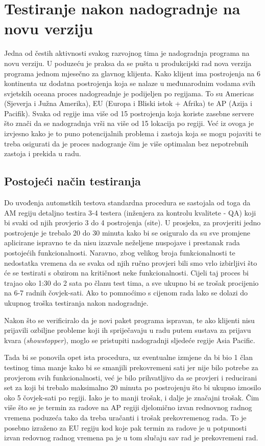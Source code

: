 \chapter{Testiranje nakon nadogradnje na novu verziju}\label{postdeploy}

Jedna od čestih aktivnosti svakog razvojnog tima je nadogradnja programa na novu verziju.
U poduzeću je praksa da se pušta u produkcijski rad nova verzija programa jednom mjesečno za glavnog klijenta. 
Kako klijent ima postrojenja na 6 kontinenta uz dodatna postrojenja koja se nalaze u međunarodnim vodama svih svjetskih oceana proces nadogreadnje je podijeljen po regijama.
To su Americas (Sjeverja i Južna Amerika), EU (Europa i Bliski istok + Afrika) te AP (Azija i Pacifik).
Svaka od regije ima više od 15 postrojenja koja koriste zasebne servere što znači da se nadogradnja vrši na više od 15 lokacija po regiji.
Već iz ovoga je izvjesno kako je to puno potencijalnih problema i zastoja koja se mogu pojaviti te treba osigurati da je proces nadogranje čim je više optimalan bez nepotrebnih zastoja i prekida u radu.

\section{Postojeći način testiranja}
Do uvođenja automstkih testova standardna procedura se sastojala od toga da AM regiju detaljno testira 3-4 testera (inženjera za kontrolu kvalitete - QA) koji bi svaki od njih provjerio 3 do 4 postrojenja (site).
U prosjeku, za provjeriti jedno postrojenje je trebalo 20 do 30 minuta kako bi se osiguralo da su sve promjene aplicirane ispravno te da nisu izazvale neželjene nuspojave i prestanak rada postojećih funkcionalnosti.
Naravno, zbog velikog broja funkcionalnosti te nedostatka vremena da se svaka od njih ručno provjeri bili smo vrlo izbirljivi što će se testirati s obzirom na kritičnost neke funkcionalnosti.
Cijeli taj proces bi trajao oko 1:30 do 2 sata po članu test tima, a sve ukupno bi se trošak procijenio na 6-7 radnih čovjek-sati.
Ako to pomnoćimo s cijenom rada lako se dolazi do ukupnog troška testiranja nakon nadogradnje.

Nakon što se verificiralo da je novi paket programa ispravan, te ako klijenti nisu prijavili ozbiljne probleme koji ih spriječavaju u radu putem sustava za prijavu kvara (\emph{showstopper}), moglo se pristupiti nadogradnji sljedeće regije Asia Pacific.

Tada bi se ponovila opet ista procedura, uz eventualne izmjene da bi bio 1 član testinog tima manje kako bi se smanjili prekovremeni sati jer nije bilo potrebe za provjerom svih funkcionalnosti, već je bilo prihvatljivo da se provjeri i reducirani set za koji bi trebalo maksimalno 20 minuta po postrojenju što bi ukupno iznosilo oko 5 čovjek-sati po regiji.
Iako je to manji trošak, i dalje je značajni trošak. 
Čim više što se je termin za radove na AP regiji djelomično izvan rednovnog radnog vremena poduzeća tako da treba uračanti i trošak prekovremenog rada.
To je posebno izraženo za EU regiju kod koje pak termin za radove je u potpunosti izvan redovnog radnog vremena pa je u tom slučaju sav rad je prekovremeni rad.  

